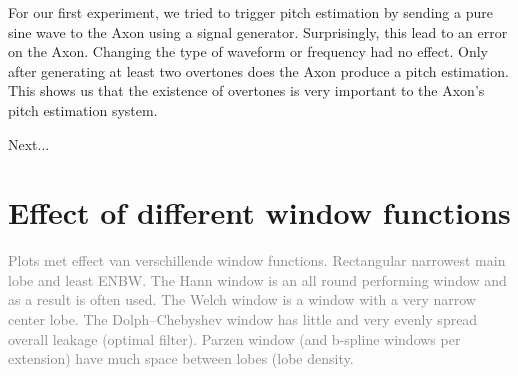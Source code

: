 \documentclass[a4paper,10pt,twocolumn]{article}
\begin{document}
For our first experiment, we tried to trigger pitch estimation by sending a pure sine wave to the Axon using a signal generator. Surprisingly, this lead to an error on the Axon. Changing the type of waveform or frequency had no effect. Only after generating at least two overtones does the Axon produce a pitch estimation. This shows us that the existence of overtones is very important to the Axon's pitch estimation system.

Next...



\section{Effect of different window functions}  \label{sec:windows}
\textcolor{gray}{Plots met effect van verschillende window functions. Rectangular narrowest main lobe and least ENBW. The Hann window is an all round performing window and as a result is often used. The Welch window is a window with a very narrow center lobe. The Dolph–Chebyshev window has little and very evenly spread overall leakage (optimal filter). Parzen window (and b-spline windows per extension) have much space between lobes (lobe density.}
\end{document}

